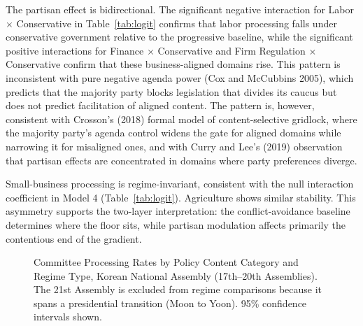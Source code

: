 \documentclass[11pt]{article}
\begin{document}
The partisan effect is bidirectional. The significant negative interaction for Labor $\times$ Conservative in Table~\ref{tab:logit} confirms that labor processing falls under conservative government relative to the progressive baseline, while the significant positive interactions for Finance $\times$ Conservative and Firm Regulation $\times$ Conservative confirm that these business-aligned domains rise. This pattern is inconsistent with pure negative agenda power (Cox and McCubbins 2005), which predicts that the majority party blocks legislation that divides its caucus but does not predict facilitation of aligned content. The pattern is, however, consistent with Crosson's (2018) formal model of content-selective gridlock, where the majority party's agenda control widens the gate for aligned domains while narrowing it for misaligned ones, and with Curry and Lee's (2019) observation that partisan effects are concentrated in domains where party preferences diverge.

Small-business processing is regime-invariant, consistent with the null interaction coefficient in Model 4 (Table~\ref{tab:logit}). Agriculture shows similar stability. This asymmetry supports the two-layer interpretation: the conflict-avoidance baseline determines where the floor sits, while partisan modulation affects primarily the contentious end of the gradient.

\begin{figure}[htbp]
\centering
\caption{Committee Processing Rates by Policy Content Category and Regime Type, Korean National Assembly (17th--20th Assemblies). The 21st Assembly is excluded from regime comparisons because it spans a presidential transition (Moon to Yoon). 95\% confidence intervals shown.}
\label{fig:coef}
\end{figure}
\end{document}
